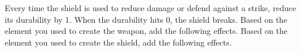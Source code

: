 \documentclass[]{dw_playbook}
\begin{document}
{{            \gap
            Every time the shield is used to reduce damage or defend against a strike, reduce its durability by 1.  When the durability hits 0, the shield breaks.  Based on the element you used to create the weapon, add the following effects.
            \gap
            Based on the element you used to create the shield, add the following effects.
            \gap
            \gapSm
            \gapSm
            }
    }
    {
        ~
    }




\clearpage
~

\resourceLinks
    {
    }
\end{document}
